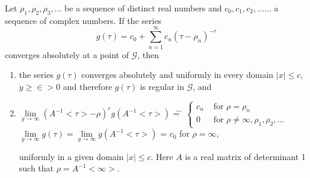 \begin{lem}\label{chap3:lem4}
Let $\rho_1, \rho_2, \rho_3, \ldots$ be a sequence of distinct real
numbers and $c_0, c_1, c_2, \ldots \ldots$ a sequence of complex
numbers. If the series 
$$
g(\tau) =c_0 + \sum^{\infty}_{n=1} c_n (\tau-\rho_n)^{-r}
$$
converges absolutely at a point of $\mathscr{G}$, then 
\begin{enumerate}
\renewcommand{\labelenumi}{\theenumi)}
\item the series $g(\tau)$ converges absolutely and uniformly in every
  domain $|x|\leq c$, $y\geq \in > 0$ and therefore $g(\tau)$
  is regular in $\mathscr{G}$, and 

\item
\begin{tabbing}
$\lim\limits_{y\to\infty} (A^{-1}<\tau>-\rho)^r g(A^{-1}<\tau>)$ \= =
  \= $ \begin{cases}
c_n & \text{ for } \rho = \rho_n\\
0 & \text{ for } \rho \neq \infty, \rho_1, \rho_2, \ldots
\end{cases}$\\
$\lim\limits_{y\to \infty} g(\tau) = \lim\limits_{y\to \infty}
g(A^{-1}<\tau>)$ \> = \> $c_0$ for $\rho = \infty,$
\end{tabbing}\pageoriginale
uniformly in a given domain $|x|\leq c$. Here $A$ is a real matrix of
determinant 1 such that $\rho=A^{-1}<\infty>$.
\end{enumerate}
\end{lem}

